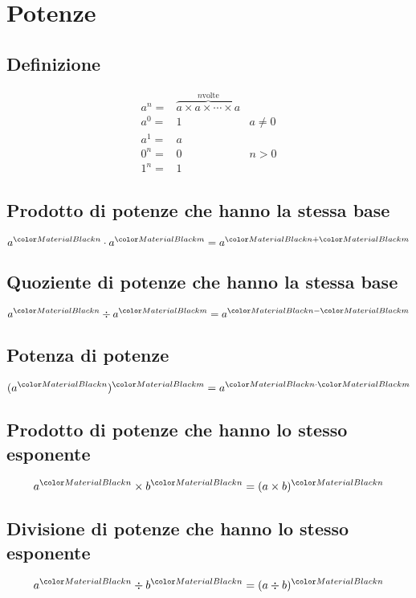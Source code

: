 \chapter{Potenze}
\section{Definizione}
\begin{align}
a^n=&\overbrace{a\times a\times\cdots\times a}^{n{}\mbox{volte}}\\
a^0=&1&a\neq0\\
a^1=&a\\
0^n=&0&n>0\\
1^n=&1%
\end{align}
\section{Prodotto di potenze che hanno la stessa base}
\begin{equation}
a^\rosso{n}\cdot a^\verde{m}=a^{\rosso{n}+\verde{m}}
\end{equation}
\section{Quoziente di potenze che hanno la stessa base}
\begin{equation}
a^\rosso{n}\div a^\verde{m}=a^{\rosso{n}-\verde{m}}
\end{equation}
\section{Potenza di potenze}
\begin{equation}
(a^\rosso{n})^\verde{m}=a^{\rosso{n}\cdot \verde{m}}
\end{equation}
\section{Prodotto di potenze che hanno lo stesso esponente}
\begin{equation}
a^\rosso{n}\times b^\rosso{n}=(a\times b)^\rosso{n}
\end{equation}
\section{Divisione di potenze che hanno lo stesso esponente}
\begin{equation}
a^\rosso{n}\div b^\rosso{n}=(a\div b )^\rosso{n}
\end{equation}
